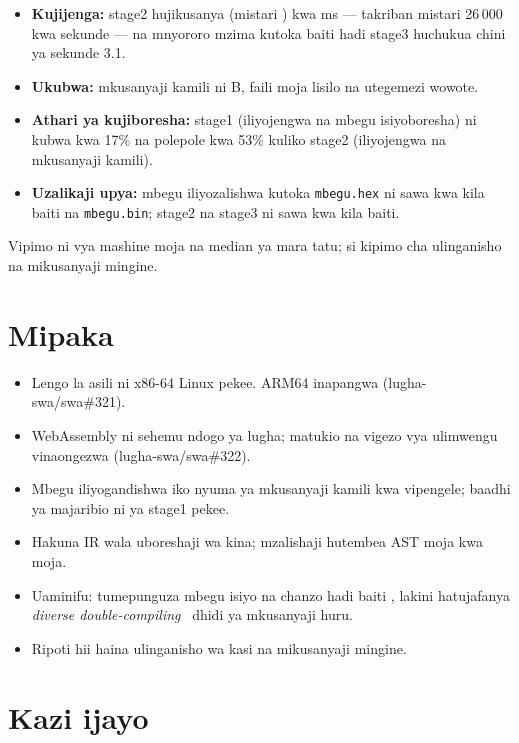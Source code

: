 \documentclass[11pt,a4paper]{article}
\begin{document}
\begin{itemize}
  \item \textbf{Kujijenga:} stage2 hujikusanya (mistari \ZimaMistari) kwa \MudaStageMbili{} ms --- takriban mistari 26\,000 kwa sekunde --- na mnyororo mzima kutoka baiti \KwanzaBaiti{} hadi stage3 huchukua chini ya sekunde 3.1.
  \item \textbf{Ukubwa:} mkusanyaji kamili ni \StageMbiliBaiti{} B, faili moja lisilo na utegemezi wowote.
  \item \textbf{Athari ya kujiboresha:} stage1 (iliyojengwa na mbegu isiyoboresha) ni kubwa kwa 17\% na polepole kwa 53\% kuliko stage2 (iliyojengwa na mkusanyaji kamili).
  \item \textbf{Uzalikaji upya:} mbegu iliyozalishwa kutoka \texttt{mbegu.hex} ni sawa kwa kila baiti na \texttt{mbegu.bin}; stage2 na stage3 ni sawa kwa kila baiti.
\end{itemize}

\noindent Vipimo ni vya mashine moja na median ya mara tatu; si kipimo cha ulinganisho na mikusanyaji mingine.

\section{Mipaka}

\begin{itemize}
  \item Lengo la asili ni x86-64 Linux pekee. ARM64 inapangwa (lugha-swa/swa\#321).
  \item WebAssembly ni sehemu ndogo ya lugha; matukio na vigezo vya ulimwengu vinaongezwa (lugha-swa/swa\#322).
  \item Mbegu iliyogandishwa iko nyuma ya mkusanyaji kamili kwa vipengele; baadhi ya majaribio ni ya stage1 pekee.
  \item Hakuna IR wala uboreshaji wa kina; mzalishaji hutembea AST moja kwa moja.
  \item Uaminifu: tumepunguza mbegu isiyo na chanzo hadi baiti \KwanzaBaiti, lakini hatujafanya \emph{diverse double-compiling}~\cite{wheeler2009} dhidi ya mkusanyaji huru.
  \item Ripoti hii haina ulinganisho wa kasi na mikusanyaji mingine.
\end{itemize}

\section{Kazi ijayo}
\end{document}
